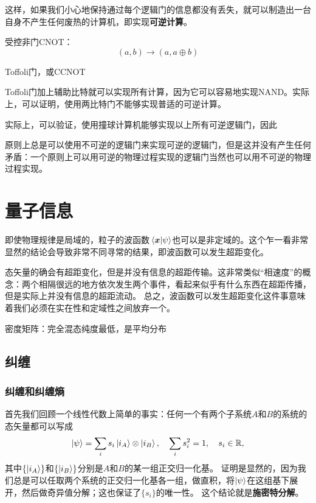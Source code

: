 \documentclass[UTF8, a4paper]{ctexart}
\begin{document}
这样，如果我们小心地保持通过每个逻辑门的信息都没有丢失，就可以制造出一台自身不产生任何废热的计算机，即实现\textbf{可逆计算}。

受控非门CNOT：
\[
    (a, b) \longrightarrow (a, a \oplus b)
\]

Toffoli门，或CCNOT

Toffoli门加上辅助比特就可以实现所有计算，因为它可以容易地实现NAND。实际上，可以证明，使用两比特门不能够实现普适的可逆计算。

实际上，可以验证，使用撞球计算机能够实现以上所有可逆逻辑门，因此

原则上总是可以使用不可逆的逻辑门来实现可逆的逻辑门，但是这并没有产生任何矛盾：一个原则上可以用可逆的物理过程实现的逻辑门当然也可以用不可逆的物理过程实现。

\section{量子信息}

即使物理规律是局域的，粒子的波函数$\braket*{\vb*{x}}{\psi}$也可以是非定域的。这个乍一看非常显然的结论会导致非常不同寻常的结果，即波函数可以发生超距变化。

态矢量的确会有超距变化，但是并没有信息的超距传输。这非常类似“相速度”的概念：两个相隔很远的地方依次发生两个事件，看起来似乎有什么东西在超距传播，但是实际上并没有信息的超距流动。
总之，波函数可以发生超距变化这件事意味着我们必须在实在性和定域性之间放弃一个。%

密度矩阵：完全混态纯度最低，是平均分布

\subsection{纠缠}

\subsubsection{纠缠和纠缠熵}

首先我们回顾一个线性代数上简单的事实：任何一个有两个子系统$A$和$B$的系统的态矢量都可以写成
\begin{equation}
    \ket{\psi} = \sum_i s_i \ket{i_A} \otimes \ket{i_B}, \quad \sum_i s_i^2 = 1, \quad s_i \in \mathbb{R},
\end{equation}
其中$\{\ket{i_A}\}$和$\{\ket{i_B}\}$分别是$A$和$B$的某一组正交归一化基。
证明是显然的，因为我们总是可以任取两个系统的正交归一化基各一组，做直积，将$\ket{\psi}$在这组基下展开，然后做奇异值分解；这也保证了$\{s_i\}$的唯一性。
这个结论就是\textbf{施密特分解}。
\end{document}
